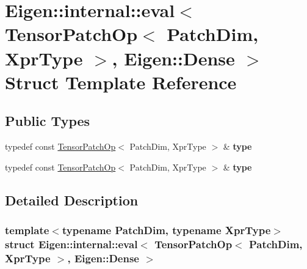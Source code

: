 \hypertarget{struct_eigen_1_1internal_1_1eval_3_01_tensor_patch_op_3_01_patch_dim_00_01_xpr_type_01_4_00_01_eigen_1_1_dense_01_4}{}\section{Eigen\+:\+:internal\+:\+:eval$<$ Tensor\+Patch\+Op$<$ Patch\+Dim, Xpr\+Type $>$, Eigen\+:\+:Dense $>$ Struct Template Reference}
\label{struct_eigen_1_1internal_1_1eval_3_01_tensor_patch_op_3_01_patch_dim_00_01_xpr_type_01_4_00_01_eigen_1_1_dense_01_4}
\subsection*{Public Types}
\begin{DoxyCompactItemize}
\item 
\mbox{\label{struct_eigen_1_1internal_1_1eval_3_01_tensor_patch_op_3_01_patch_dim_00_01_xpr_type_01_4_00_01_eigen_1_1_dense_01_4_adf7bbb0f84d9d9266e14b0ad534f5db1}} 
typedef const \hyperlink{class_eigen_1_1_tensor_patch_op}{Tensor\+Patch\+Op}$<$ Patch\+Dim, Xpr\+Type $>$ \& {\bfseries type}
\item 
\mbox{\label{struct_eigen_1_1internal_1_1eval_3_01_tensor_patch_op_3_01_patch_dim_00_01_xpr_type_01_4_00_01_eigen_1_1_dense_01_4_adf7bbb0f84d9d9266e14b0ad534f5db1}} 
typedef const \hyperlink{class_eigen_1_1_tensor_patch_op}{Tensor\+Patch\+Op}$<$ Patch\+Dim, Xpr\+Type $>$ \& {\bfseries type}
\end{DoxyCompactItemize}


\subsection{Detailed Description}
\subsubsection*{template$<$typename Patch\+Dim, typename Xpr\+Type$>$\newline
struct Eigen\+::internal\+::eval$<$ Tensor\+Patch\+Op$<$ Patch\+Dim, Xpr\+Type $>$, Eigen\+::\+Dense $>$}



